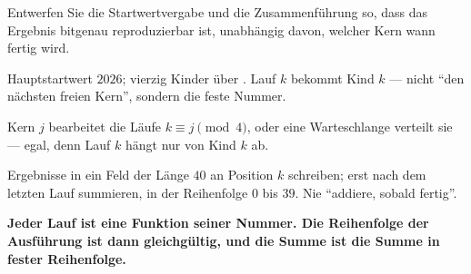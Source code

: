 \begin{aufgabe}
Entwerfen Sie die Startwertvergabe und die Zusammenführung so, dass das Ergebnis bitgenau reproduzierbar ist, unabhängig davon, welcher Kern wann fertig wird.

\loesung
{}
Hauptstartwert $2026$; vierzig Kinder über . Lauf $k$ bekommt Kind $k$ --- nicht \enquote{den nächsten freien Kern}, sondern die feste Nummer.

Kern $j$ bearbeitet die Läufe $k \equiv j \pmod 4$, oder eine Warteschlange verteilt sie --- egal, denn Lauf $k$ hängt nur von Kind $k$ ab.

Ergebnisse in ein Feld der Länge $40$ an Position $k$ schreiben; erst nach dem letzten Lauf summieren, in der Reihenfolge $0$ bis $39$. Nie \enquote{addiere, sobald fertig}.

\begin{center}
\begin{minipage}{0.9\textwidth}
\textbf{Jeder Lauf ist eine Funktion seiner Nummer. Die Reihenfolge der Ausführung ist dann gleichgültig, und die Summe ist die Summe in fester Reihenfolge.}
\end{minipage}
\end{center}

\begin{center}
\begin{minipage}{0.88\textwidth}
\end{minipage}
\end{center}
\end{aufgabe}

